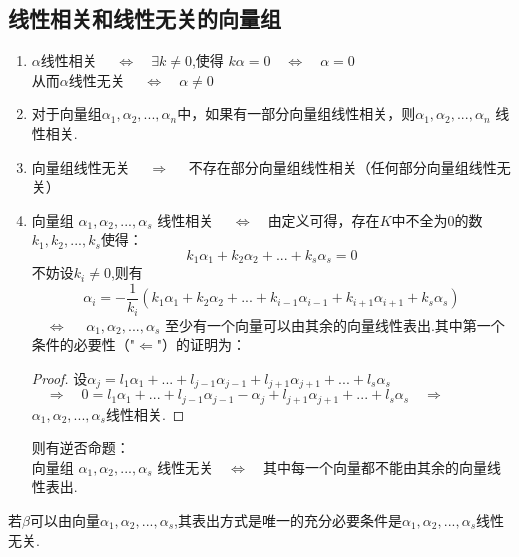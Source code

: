 \documentclass[blue,normal,cn]{elegantnote}
\begin{document}
\subsection{线性相关和线性无关的向量组}
\begin{enumerate}[(1)]
    \item $α$线性相关 $\quad \Longleftrightarrow \quad \exists k≠0$,使得 $kα=0 \quad \Longleftrightarrow \quad α=0$\\从而$α$线性无关  $\quad \Longleftrightarrow \quad  α ≠ 0$
    \item 对于向量组$α_1,α_2,...,α_n$中，如果有一部分向量组线性相关，则$α_1,α_2,...,α_n$ 线性相关.
    \item 向量组线性无关   $\quad \Longrightarrow \quad$ 不存在部分向量组线性相关（任何部分向量组线性无关）
    \item 向量组 $α_1,α_2,...,α_s$ 线性相关 $\quad \Longleftrightarrow \quad$由定义可得，存在$K$中不全为$0$的数$k_1,k_2,...,k_s$使得：
        $$
            k_1α_1+k_2α_2+...+k_sα_s=0
        $$
        不妨设$k_i≠ 0$,则有
        $$
            α_i=-\frac{1}{k_i}(k_1α_1+k_2α_2+...+k_{i-1}α_{i-1}+k_{i+1}α_{i+1}+k_sα_s)
        $$
        $\quad \Longleftrightarrow \quad$ $α_1,α_2,...,α_s$ 至少有一个向量可以由其余的向量线性表出.其中第一个条件的必要性（"$\Leftarrow$"）的证明为：
        \begin{proof}
            设$α_j=l_1α_1+...+l_{j-1} α_{j-1}+l_{j+1} α_{j+1}+...+l_s α_s$\\
            $\quad \Longrightarrow \quad 0=l_1α_1+...+l_{j-1} α_{j-1}-α_j+l_{j+1} α_{j+1}+...+l_s α_s   \quad \Longrightarrow \quad $
            $α_1,α_2,...,α_s$线性相关.
        \end{proof}
        则有逆否命题：
        \\向量组 $α_1,α_2,...,α_s$ 线性无关$\quad \Longleftrightarrow \quad$其中每一个向量都不能由其余的向量线性表出.
\end{enumerate}


\begin{proposition}
    \label{linear_show_only}
若$β$可以由向量$α_1,α_2,...,α_s$,其表出方式是唯一的充分必要条件是$α_1,α_2,...,α_s$线性无关.
\end{proposition}
\end{document}
